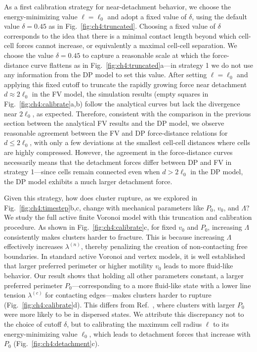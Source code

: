 As a first calibration strategy for near-detachment behavior, we choose the energy-minimizing value $\ell = \ell_0$ and adopt a fixed value of $\delta$, using the default value $\delta=0.45$ as in Fig.~\ref{fig:ch4:truncated}. Choosing a fixed value of $\delta$ corresponds to the idea that there is a minimal contact length beyond which cell-cell forces cannot increase, or equivalently a maximal cell-cell separation.
We choose the value $\delta = 0.45$ to capture a reasonable scale at which the force-distance curve flattens as in Fig.~\ref{fig:ch4:truncated}a---in strategy 1 we do not use any information from the DP model to set this value.
After setting $\ell=\ell_0$ and applying this fixed cutoff to truncate the rapidly growing force near detachment $d\approx2\ell_0$ in the FV model,
the simulation results (empty squares in Fig.~\ref{fig:ch4:calibrate}a,b) follow the analytical curves but lack the divergence near $2\ell_0$, as expected. Therefore, consistent with the comparison in the previous section between the analytical FV results and the DP model, we observe reasonable agreement between the FV and DP force-distance relations for $d\leqslant 2\ell_0$, with only a few deviations at the smallest cell-cell distances where cells are highly compressed. However, the agreement in the force-distance curves necessarily means that the detachment forces differ between DP and FV in strategy 1---since cells remain connected even when $d>2\ell_0$ in the DP model, the DP model exhibits a much larger detachment force.

Given this strategy, how does cluster rupture, as we explored in Fig.~\ref{fig:ch4:timestep}b,c, change with mechanical parameters like $P_0$, $v_0$, and $\Lambda$? We study the full active finite Voronoi model with this truncation and calibration procedure. As shown in Fig.~\ref{fig:ch4:calibrate}c, for fixed $v_0$ and $P_0$, increasing $\Lambda$ consistently makes clusters harder to fracture. This is because increasing $\Lambda$ effectively increases $\lambda^{(n)}$, thereby penalizing the creation of non-contacting free boundaries.
In standard active Voronoi and vertex models, it is well established that larger preferred perimeter or higher motility $v_0$ leads to more fluid-like behavior.
Our result shows that holding all other parameters constant, a larger preferred perimeter $P_0$---corresponding to a more fluid-like state with a lower line tension $\lambda^{(c)}$ for contacting edges---makes clusters harder to rupture (Fig.~\ref{fig:ch4:calibrate}d). This differs from Ref.~\cite{huang2023bridging}, where clusters with larger $P_0$ were more likely to be in dispersed states.
We attribute this discrepancy not to the choice of cutoff $\delta$, but to calibrating the maximum cell radius $\ell$ to its energy-minimizing value $\ell_0$, which leads to detachment forces that increase with $P_0$ (Fig.~\ref{fig:ch4:detachment}c).


